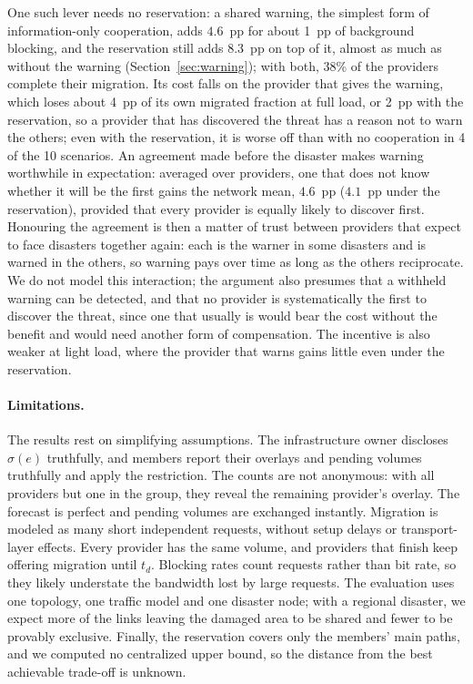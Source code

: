 \documentclass[11pt,a4paper]{article}
\theoremstyle{definition}
\begin{document}
One such lever needs no reservation: a shared warning, the simplest form of information-only cooperation, adds $4.6$~pp for about 1~pp of background blocking, and the reservation still adds $8.3$~pp on top of it, almost as much as without the warning (Section~\ref{sec:warning}); with both, 38\% of the providers complete their migration.
Its cost falls on the provider that gives the warning, which loses about 4~pp of its own migrated fraction at full load, or 2~pp with the reservation, so a provider that has discovered the threat has a reason not to warn the others; even with the reservation, it is worse off than with no cooperation in 4 of the 10 scenarios.
An agreement made before the disaster makes warning worthwhile in expectation: averaged over providers, one that does not know whether it will be the first gains the network mean, $4.6$~pp ($4.1$~pp under the reservation), provided that every provider is equally likely to discover first.
Honouring the agreement is then a matter of trust between providers that expect to face disasters together again: each is the warner in some disasters and is warned in the others, so warning pays over time as long as the others reciprocate.
We do not model this interaction; the argument also presumes that a withheld warning can be detected, and that no provider is systematically the first to discover the threat, since one that usually is would bear the cost without the benefit and would need another form of compensation.
The incentive is also weaker at light load, where the provider that warns gains little even under the reservation.

\paragraph{Limitations.}
The results rest on simplifying assumptions.
The infrastructure owner discloses $\sigma(e)$ truthfully, and members report their overlays and pending volumes truthfully and apply the restriction. The counts are not anonymous: with all providers but one in the group, they reveal the remaining provider's overlay.
The forecast is perfect and pending volumes are exchanged instantly.
Migration is modeled as many short independent requests, without setup delays or transport-layer effects. Every provider has the same volume, and providers that finish keep offering migration until $t_d$.
Blocking rates count requests rather than bit rate, so they likely understate the bandwidth lost by large requests.
The evaluation uses one topology, one traffic model and one disaster node; with a regional disaster, we expect more of the links leaving the damaged area to be shared and fewer to be provably exclusive.
Finally, the reservation covers only the members' main paths, and we computed no centralized upper bound, so the distance from the best achievable trade-off is unknown.
\end{document}
